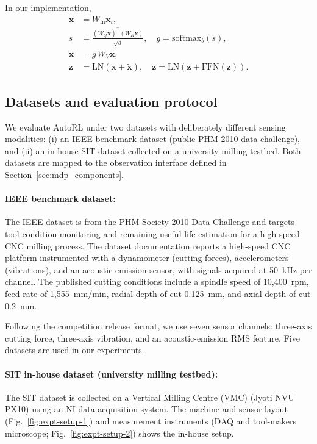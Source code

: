 \documentclass[sn-basic]{sn-jnl} %
\begin{document}
In our implementation,
\begin{align}
	\mathbf{x} &= W_{\mathrm{in}}\mathbf{x}_t,\\
	s &= \frac{(W_Q\mathbf{x})^\top(W_K\mathbf{x})}{\sqrt{d}},\quad g=\mathrm{softmax}_b(s),\\
	\tilde{\mathbf{x}} &= g\,W_V\mathbf{x},\\
	\mathbf{z} &= \mathrm{LN}\!\left(\mathbf{x}+\tilde{\mathbf{x}}\right),\quad
\mathbf{z}=\mathrm{LN}\!\left(\mathbf{z}+\mathrm{FFN}(\mathbf{z})\right).
\end{align}

\subsection{Datasets and evaluation protocol} \label{sec:experiment} 

We evaluate AutoRL under two datasets with deliberately different sensing modalities: (i) an IEEE benchmark dataset (public PHM 2010 data challenge), and (ii) an in-house SIT dataset collected on a university milling testbed. Both datasets are mapped to the observation interface defined in Section~\ref{sec:mdp_components}.%

\paragraph{IEEE benchmark dataset:}
The IEEE dataset \cite{PHMdata2010} is from the PHM Society 2010 Data Challenge and targets tool-condition monitoring and remaining useful life estimation for a high-speed CNC milling process. The dataset documentation reports a high-speed CNC platform instrumented with a dynamometer (cutting forces), accelerometers (vibrations), and an acoustic-emission sensor, with signals acquired at 50~kHz per channel. The published cutting conditions include a spindle speed of 10{,}400~rpm, feed rate of 1{,}555~mm/min, radial depth of cut 0.125~mm, and axial depth of cut 0.2~mm.

Following the competition release format, we use seven sensor channels: three-axis cutting force, three-axis vibration, and an acoustic-emission RMS feature. Five datasets are used in our experiments.

\paragraph{SIT in-house dataset (university milling testbed):}
The SIT dataset is collected on a Vertical Milling Centre (VMC) (Jyoti NVU PX10) using an NI data acquisition system. The machine-and-sensor layout (Fig.~\ref{fig:expt-setup-1}) and measurement instruments (DAQ and tool-makers microscope; Fig.~\ref{fig:expt-setup-2}) shows the in-house setup.
\end{document}
